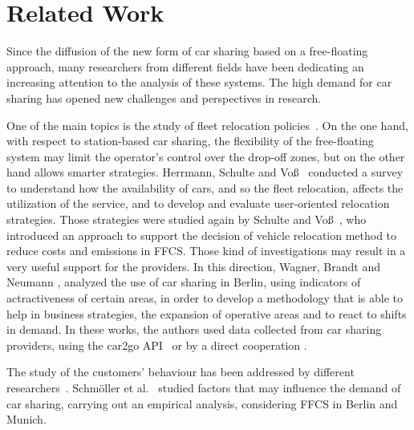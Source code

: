 \section{Related Work}
\label{sec:3_2_related}
Since the diffusion of the new form of car sharing based on a free-floating approach, many researchers from different fields have been dedicating an increasing attention to the analysis of these systems.
The high demand for car sharing has opened new challenges and perspectives in research.

One of the main topics is the study of fleet relocation policies~\cite{Herrmann2014,Schulte2015,Wagner2015}. On the one hand, with respect to station-based car sharing, the flexibility of the free-floating system may limit the operator's control over the drop-off zones, but on the other hand allows smarter strategies. 
Herrmann, Schulte and Voß~\cite{Herrmann2014} conducted a survey to understand how the availability of cars, and so the fleet relocation, affects the utilization of the service, and to develop and evaluate user-oriented relocation strategies.
Those strategies were studied again by Schulte and Voß~\cite{Schulte2015}, who introduced an approach to support the decision of vehicle relocation method to reduce costs and emissions in FFCS.
Those kind of investigations may result in a very useful support for the providers. In this direction, Wagner, Brandt and Neumann \cite{Wagner2015}, analyzed the use of car sharing in Berlin, using indicators of actractiveness of certain areas, in order to develop a methodology that is able to help in business strategies, the expansion of operative areas and to react to shifts in demand. In these works, the authors used data collected from car sharing providers, using the car2go API~\cite{Herrmann2014,Schulte2015} or by a direct cooperation \cite{Wagner2015}.

The study of the customers' behaviour has been addressed by different researchers~\cite{Schmoller2015,Kopp2015,Firnkorn2012,Ciari2013,Tyndall2016}. 
Schmöller et al.~\cite{Schmoller2015} studied factors that may influence the demand of car sharing, carrying out an empirical analysis, considering FFCS in Berlin and Munich.

